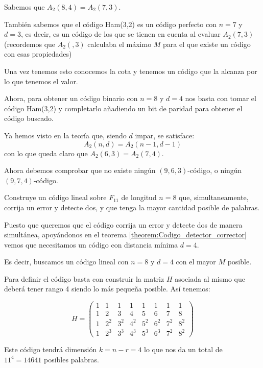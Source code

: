 \begin{problem}[8]
\spart

Sabemos que $A_2(8,4)=A_2(7,3)$.

También sabemos que el código Ham(3,2) es un código perfecto con $n=7$ y $d=3$, es decir, es un código de los que se tienen en cuenta al evaluar $A_2(7,3)$ (recordemos que $A_2(,3)$ calculaba el máximo $M$ para el que existe un código con esas propiedades)

Una vez tenemos esto conocemos la cota y tenemos un código que la alcanza por lo que tenemos el valor.

Ahora, para obtener un código binario con $n=8$ y $d=4$ nos basta con tomar el código Ham(3,2) y completarlo añadiendo un bit de paridad para obtener el código buscado.

\spart
{}

Ya hemos visto en la teoría que, siendo $d$ impar, se satisface:
\[A_2(n,d)=A_2(n-1,d-1)\]
con lo que queda claro que $A_2(6,3)=A_2(7,4)$.

Ahora debemos comprobar que no existe ningún $(9,6,3)$-código, o ningún $(9,7,4)$-código.

\end{problem}

\begin{problem}[9]
Construye un código lineal sobre $ F_{11}$ de longitud $n=8$
que, simultaneamente, corrija un error y detecte dos, y que tenga
la mayor cantidad posible de palabras.
\solution


Puesto que queremos que el código corrija un error y detecte dos de manera simultánea, apoyándonos en el teorema \ref{theorem:Codigo_detector_corrector} vemos que necesitamos un código con distancia mínima $d=4$.

Es decir, buscamos un código lineal con $n=8$ y $d=4$ con el mayor $M$ posible.

Para definir el código basta con construir la matriz $H$ asociada al mismo que deberá tener rango 4 siendo lo más pequeña posible. Así tenemos:

\[H=\left(\begin{array}{cccccccc}
1 & 1 & 1 & 1 & 1 & 1 & 1 & 1\\
1 & 2 & 3 & 4 & 5 & 6 & 7 & 8\\
1 & 2^2 & 3^2 & 4^2 & 5^2 & 6^2 & 7^2 & 8^2\\
1 & 2^3 & 3^3 & 4^3 & 5^3 & 6^3 & 7^2 & 8^2
 \end{array} \right)\]

Este código tendrá dimensión $k=n-r=4$ lo que nos da un total de $11^4=14641$ posibles palabras.
\end{problem}

